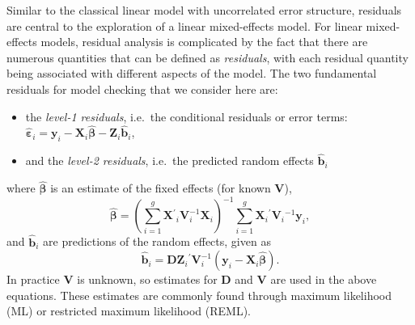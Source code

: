 \documentclass[12pt]{article} %
\newcommand{\alnote}[1]{\todo[inline,color=green!40]{#1}} %
\newcommand{\inv}{\ensuremath{^{-1}}}
\newcommand{\trans}{\ensuremath{^\prime}}
\begin{document}
Similar to the classical linear model with uncorrelated error structure, residuals are central to the exploration of a linear mixed-effects model. For linear mixed-effects models, residual analysis is complicated by the fact that there are numerous quantities that can be defined as \emph{residuals}, with each residual quantity being associated with different aspects of the model. The two fundamental residuals for model checking that we consider here are:
%
\begin{itemize}
\item the \emph{level-1 residuals}, i.e.~the conditional residuals or error terms: $\widehat{\bm{\varepsilon}}_i = \bm{y}_i - \bm{X}_i \widehat{\bm{\beta}} - \bm{Z}_i \widehat{\bm{b}}_i$,

\item and the \emph{level-2 residuals}, i.e.~the predicted random effects $\widehat{\bm{b}}_i$
\end{itemize}
%
where $\widehat{\bm{\beta}}$ is an estimate of the fixed effects (for known $\bm{V}$),
\begin{equation}\label{eq:glsb}
	\widehat{\bm{\beta}} = 
	\left(\sum^g_{i=1} \bm{X}\trans_i \bm{V}^{-1}_i \bm{X}_i \right)^{-1} 
	\sum^g_{i=1} \bm{X}_i\trans \bm{V}_i\inv \bm{y}_i,
\end{equation}
and $\widehat{\bm{b}}_i$ are predictions of the random effects, given as
\begin{equation}\label{eq:eb}
	\widehat{\bm{b}}_i = \bm{D} \bm{Z}_i\trans \bm{V}_i^{-1} 
	\left(\bm{y}_i - \bm{X}_i \widehat{\bm{\beta}} \right).
\end{equation}
%
In practice $\bm{V}$ is unknown, so estimates for $\bm{D}$ and $\bm{V}$ are used in the above equations. These estimates are commonly found through maximum likelihood (ML) or restricted maximum likelihood (REML). %

\end{document}
